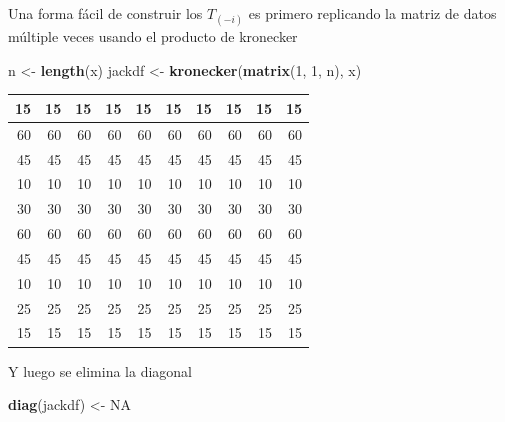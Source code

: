 \documentclass[
  12pt,
]{book}
\newenvironment{Shaded}{\begin{snugshade}}{\end{snugshade}}
\newcommand{\DecValTok}[1]{\textcolor[rgb]{0.00,0.00,0.81}{#1}}
\newcommand{\KeywordTok}[1]{\textcolor[rgb]{0.13,0.29,0.53}{\textbf{#1}}}
\newcommand{\NormalTok}[1]{#1}
\newcommand{\OtherTok}[1]{\textcolor[rgb]{0.56,0.35,0.01}{#1}}
\newcommand{\StringTok}[1]{\textcolor[rgb]{0.31,0.60,0.02}{#1}}
\theoremstyle{definition}
\theoremstyle{definition}
\theoremstyle{definition}
\theoremstyle{remark}
\let\BeginKnitrBlock\begin \let\EndKnitrBlock\end
\begin{document}
\BeginKnitrBlock{exercise}
\protect\hypertarget{exr:unnamed-chunk-67}{}{\label{exr:unnamed-chunk-67} }Una forma fácil de construir los \(T_{(-i)}\) es primero replicando
la matriz de datos múltiple veces usando el producto de kronecker
\EndKnitrBlock{exercise}

\begin{Shaded}
\begin{Highlighting}[]
\NormalTok{n <-}\StringTok{ }\KeywordTok{length}\NormalTok{(x)}
\NormalTok{jackdf <-}\StringTok{ }\KeywordTok{kronecker}\NormalTok{(}\KeywordTok{matrix}\NormalTok{(}\DecValTok{1}\NormalTok{, }\DecValTok{1}\NormalTok{, n), x)}
\end{Highlighting}
\end{Shaded}

\begin{tabular}{r|r|r|r|r|r|r|r|r|r}
\hline
15 & 15 & 15 & 15 & 15 & 15 & 15 & 15 & 15 & 15\\
\hline
60 & 60 & 60 & 60 & 60 & 60 & 60 & 60 & 60 & 60\\
\hline
45 & 45 & 45 & 45 & 45 & 45 & 45 & 45 & 45 & 45\\
\hline
10 & 10 & 10 & 10 & 10 & 10 & 10 & 10 & 10 & 10\\
\hline
30 & 30 & 30 & 30 & 30 & 30 & 30 & 30 & 30 & 30\\
\hline
60 & 60 & 60 & 60 & 60 & 60 & 60 & 60 & 60 & 60\\
\hline
45 & 45 & 45 & 45 & 45 & 45 & 45 & 45 & 45 & 45\\
\hline
10 & 10 & 10 & 10 & 10 & 10 & 10 & 10 & 10 & 10\\
\hline
25 & 25 & 25 & 25 & 25 & 25 & 25 & 25 & 25 & 25\\
\hline
15 & 15 & 15 & 15 & 15 & 15 & 15 & 15 & 15 & 15\\
\hline
\end{tabular}

Y luego se elimina la diagonal

\begin{Shaded}
\begin{Highlighting}[]
\KeywordTok{diag}\NormalTok{(jackdf) <-}\StringTok{ }\OtherTok{NA}
\end{Highlighting}
\end{Shaded}
\end{document}
